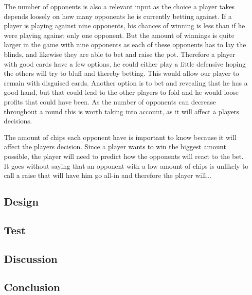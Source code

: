 The number of opponents is also a relevant input as the choice a player takes depends loosely on how many opponents he is currently betting against. If a player is playing against nine opponents, his chances of winning is less than if he were playing against only one opponent. But the amount of winnings is quite larger in the game with nine opponents as each of these opponents has to lay the blinds, and likewise they are able to bet and raise the pot.
Therefore a player with good cards have a few options, he could either play a little defensive hoping the others will try to bluff and thereby betting. This would allow our player to remain with disguised cards. Another option is to bet and revealing that he has a good hand, but that could lead to the other players to fold and he would loose profits that could have been. As the number of opponents can decrease throughout a round this is worth taking into account, as it will affect a players decisions.

The amount of chips each opponent have is important to know because it will affect the players decision. Since a player wants to win the biggest amount possible, the player will need to predict how the opponents will react to the bet. It goes without saying that an opponent with a low amount of chips is unlikely to call a raise that will have him go all-in and therefore the player will...



\subsection{Design}



\subsection{Test}


\subsection{Discussion}

\subsection{Conclusion}